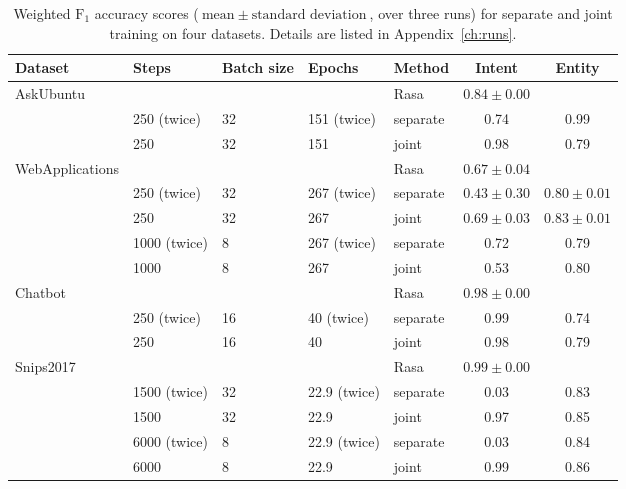 \begin{table}[htbp]
    \centering
    \begin{tabular}{l l l l l c c}
        \textbf{Dataset}    & \textbf{Steps}  & \textbf{Batch size} & \textbf{Epochs}  & \textbf{Method}   & \textbf{Intent}  & \textbf{Entity}\\
        \hline
        AskUbuntu           & & & & Rasa & $0.84 \pm 0.00$ \\
                            & 250 (twice) & 32 & 151 (twice) &  separate & 0.74 & 0.99\\
                            & 250 & 32 & 151 & joint & 0.98 & 0.79\\
        \hline
        WebApplications     & & & & Rasa & $0.67 \pm 0.04$\\
                            & 250 (twice) & 32 & 267 (twice) & separate & $0.43 \pm 0.30$ & $0.80 \pm 0.01$ \\
                            & 250 & 32 & 267 & joint & $0.69 \pm 0.03$ & $0.83 \pm 0.01$ \\
                            & 1000 (twice) & 8 & 267 (twice) & separate & 0.72 & 0.79\\
                            & 1000 & 8 & 267 & joint & 0.53 & 0.80\\
        \hline
        Chatbot             & & & & Rasa & $0.98 \pm 0.00$ \\
                            & 250 (twice) & 16 & 40 (twice) & separate & 0.99 & 0.74\\
                            & 250 & 16 & 40 & joint & 0.98 & 0.79\\
        \hline
        Snips2017           & & & & Rasa & $0.99 \pm 0.00$\\
                            & 1500 (twice) & 32 & 22.9 (twice) & separate & 0.03 & 0.83\\
                            & 1500 & 32 & 22.9 & joint & 0.97 & 0.85\\
                            & 6000 (twice) & 8 & 22.9 (twice) & separate & 0.03 & 0.84 \\
                            & 6000 & 8 & 22.9 & joint & 0.99 & 0.86 \\
        \hline
    \end{tabular}
    \caption{Weighted $\text{F}_1$ accuracy scores ($\text{mean} \: \pm \: \text{standard deviation}$, over three runs) for separate and joint training on four datasets.
    Details are listed in Appendix~\ref{ch:runs}.}
    \label{tab:runs_scores}
\end{table}

